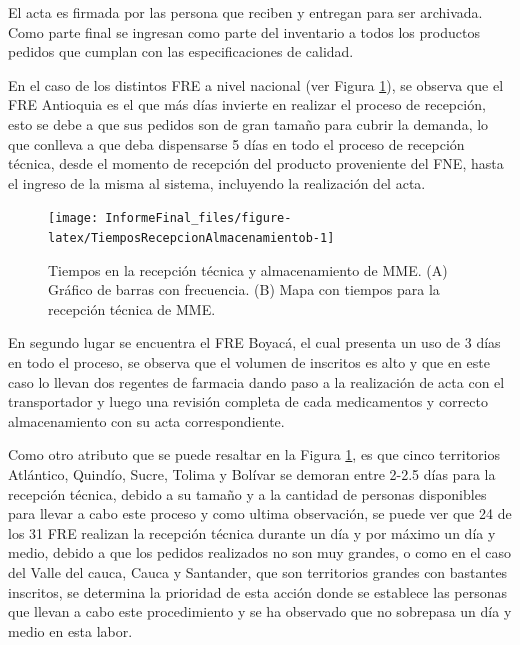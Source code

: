 \documentclass[
  oneside]{book}
\begin{document}
El acta es firmada por las persona que reciben y entregan para ser archivada. Como parte final se ingresan como parte del inventario a todos los productos pedidos que cumplan con las especificaciones de calidad.

En el caso de los distintos FRE a nivel nacional (ver Figura \ref{fig:TiemposRecepcionAlmacenamientob}), se observa que el FRE Antioquia es el que más días invierte en realizar el proceso de recepción, esto se debe a que sus pedidos son de gran tamaño para cubrir la demanda, lo que conlleva a que deba dispensarse 5 días en todo el proceso de recepción técnica, desde el momento de recepción del producto proveniente del FNE, hasta el ingreso de la misma al sistema, incluyendo la realización del acta.

\begin{figure}

{\centering \texttt{[image: InformeFinal\_files/figure-latex/TiemposRecepcionAlmacenamientob-1]} 

}

\caption{Tiempos en la recepción técnica y almacenamiento de MME. (A) Gráfico de barras con frecuencia. (B) Mapa con tiempos para la recepción técnica de MME.}\label{fig:TiemposRecepcionAlmacenamientob}
\end{figure}

En segundo lugar se encuentra el FRE Boyacá, el cual presenta un uso de 3 días en todo el proceso, se observa que el volumen de inscritos es alto y que en este caso lo llevan dos regentes de farmacia dando paso a la realización de acta con el transportador y luego una revisión completa de cada medicamentos y correcto almacenamiento con su acta correspondiente.

Como otro atributo que se puede resaltar en la Figura \ref{fig:TiemposRecepcionAlmacenamientob}, es que cinco territorios Atlántico, Quindío, Sucre, Tolima y Bolívar se demoran entre 2-2.5 días para la recepción técnica, debido a su tamaño y a la cantidad de personas disponibles para llevar a cabo este proceso y como ultima observación, se puede ver que 24 de los 31 FRE realizan la recepción técnica durante un día y por máximo un día y medio, debido a que los pedidos realizados no son muy grandes, o como en el caso del Valle del cauca, Cauca y Santander, que son territorios grandes con bastantes inscritos, se determina la prioridad de esta acción donde se establece las personas que llevan a cabo este procedimiento y se ha observado que no sobrepasa un día y medio en esta labor.
\end{document}
